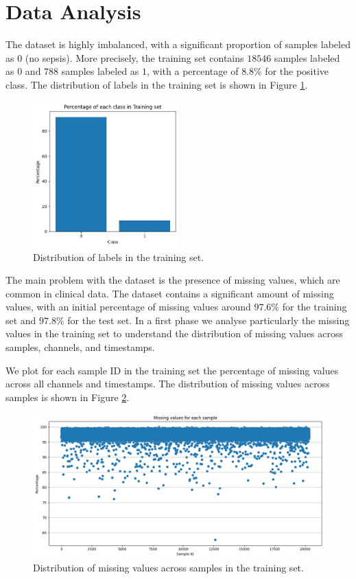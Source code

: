 \documentclass[a4paper,11pt]{article}
\begin{document}
\section{Data Analysis}
The dataset is highly imbalanced, with a significant proportion of samples labeled as $0$ (no sepsis).
More precisely, the training set contains $18546$ samples labeled as $0$ and $788$ samples labeled as $1$,
with a percentage of $8.8\%$ for the positive class.
The distribution of labels in the training set is shown in Figure \ref{fig:labels_tr}.
\begin{figure}[htbp]
\centering
\includegraphics[width=0.5\textwidth]{imgs/labels_tr.png}
\caption{Distribution of labels in the training set.}
\label{fig:labels_tr}
\end{figure}

The main problem with the dataset is the presence of missing values, which are common in clinical data.
The dataset contains a significant amount of missing values, with an initial percentage of missing values around $97.6\%$ for the training set and $97.8\%$ for the test set.
In a first phase we analyse particularly the missing values in the training set to understand the distribution of missing values across samples, channels, and timestamps.

We plot for each sample ID in the training set the percentage of missing values across all channels and timestamps.
The distribution of missing values across samples is shown in Figure \ref{fig:missing_values_samples}.
\begin{figure}[htbp]
\centering
\includegraphics[width=1.0\textwidth]{imgs/missing_values_samples.png}
\caption{Distribution of missing values across samples in the training set.}
\label{fig:missing_values_samples}
\end{figure}
\end{document}
